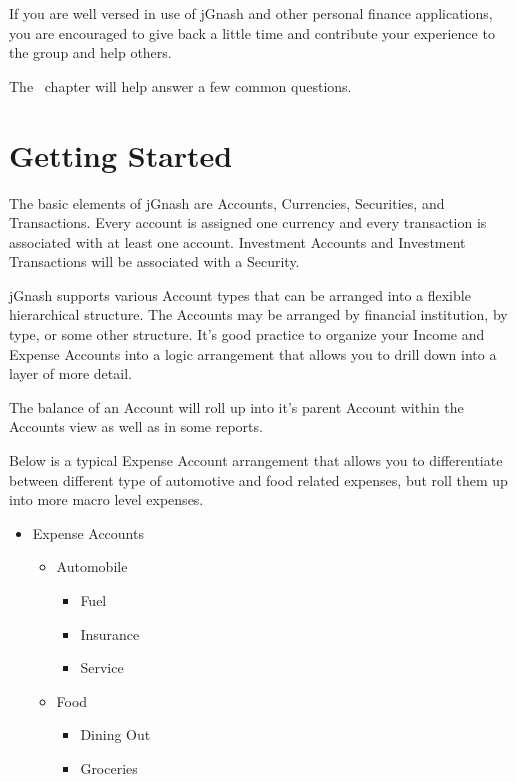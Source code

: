 \documentclass[letterpaper,12pt]{book}
\begin{document}
    If you are well versed in use of jGnash and other personal finance applications, you are encouraged to give back a
    little time and contribute your experience to the group and help others.

    The~ chapter will help answer a few common questions.
      
    \chapter{Getting Started}\label{ch:getting-started}
    The basic elements of jGnash are Accounts, Currencies, Securities, and Transactions.
    Every account is assigned one currency and every transaction is associated with at least one account.
    Investment Accounts and Investment Transactions will be associated with a Security.

    jGnash supports various Account types that can be arranged into a flexible hierarchical structure.
    The Accounts may be arranged by financial institution, by type, or some other structure.
    It's good practice to organize your Income and Expense Accounts into a logic arrangement that allows you to drill
    down into a layer of more detail.

    The balance of an Account will roll up into it's parent Account within the Accounts view as well as in some reports.

    Below is a typical Expense Account arrangement that allows you to differentiate between different type of automotive
    and food related expenses, but roll them up into more macro level expenses.

    \begin{mdframed}[style=info]
        \begin{itemize}
            \item Expense Accounts
            \begin{itemize}
                \item Automobile
                \begin{itemize}
                    \item Fuel
                    \item Insurance
                    \item Service
                \end{itemize}
                \item Food
                \begin{itemize}
                    \item Dining Out
                    \item Groceries
                \end{itemize}
            \end{itemize}
        \end{itemize}
    \end{mdframed}
\end{document}
